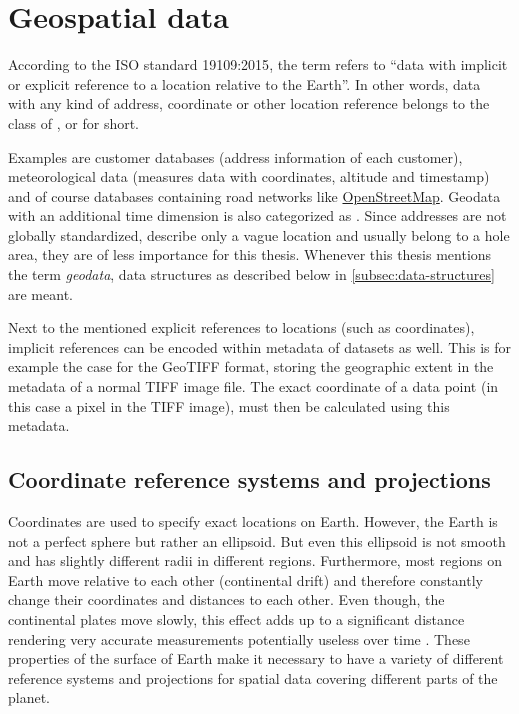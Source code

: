 
\section{Geospatial data}

	According to the ISO standard 19109:2015\cite{geolexica-202}, the term  refers to \enquote{data with implicit or explicit reference to a location relative to the Earth}.
	In other words, data with any kind of address, coordinate or other location reference belongs to the class of , or  for short.
	
	Examples are customer databases (address information of each customer), meteorological data (measures data with coordinates, altitude and timestamp) and of course databases containing road networks like \hyperref[subsec:osm]{OpenStreetMap}.
	Geodata with an additional time dimension is also categorized as .
	Since addresses are not globally standardized, describe only a vague location and usually belong to a hole area, they are of less importance for this thesis.
	Whenever this thesis mentions the term \emph{geodata}, data structures as described below in \cref{subsec:data-structures} are meant.
	
	Next to the mentioned explicit references to locations (such as coordinates), implicit references can be encoded within metadata of datasets as well.
	This is for example the case for the GeoTIFF format, storing the geographic extent in the metadata of a normal TIFF image file\cite{ogc-geotiff}.
	The exact coordinate of a data point (in this case a pixel in the TIFF image), must then be calculated using this metadata.

	\subsection{Coordinate reference systems and projections}
	
		Coordinates are used to specify exact locations on Earth.
		However, the Earth is not a perfect sphere but rather an ellipsoid.
		But even this ellipsoid is not smooth and has slightly different radii in different regions.
		Furthermore, most regions on Earth move relative to each other (continental drift) and therefore constantly change their coordinates and distances to each other.
		Even though, the continental plates move slowly, this effect adds up to a significant distance rendering very accurate measurements potentially useless over time \cite[7]{ordenance-survey-booklet}.
		These properties of the surface of Earth make it necessary to have a variety of different reference systems and projections for spatial data covering different parts of the planet.
		
